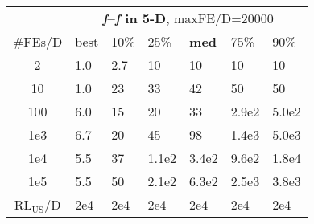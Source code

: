 \begin{tabular}{c|llllll}
 & \multicolumn{6}{|c}{\textbf{\textit{f}\raisebox{-0.35ex}{1}--\textit{f}\raisebox{-0.35ex}{24} in 5-D}, maxFE/D=20000}\\
\#FEs/D & best & 10\% & 25\% & \textbf{med} & 75\% & 90\%\\
2 & \hspace*{1ex}1.0 & \hspace*{1ex}2.7 & 10 & 10 & 10 & 10\\
10 & \hspace*{1ex}1.0 & 23 & 33 & 42 & 50 & 50\\
100 & \hspace*{1ex}6.0 & 15 & 20 & 33 & 2.9e2 & 5.0e2\\
1e3 & \hspace*{1ex}6.7 & 20 & 45 & 98 & 1.4e3 & 5.0e3\\
1e4 & \hspace*{1ex}5.5 & 37 & 1.1e2 & 3.4e2 & 9.6e2 & 1.8e4\\
1e5 & \hspace*{1ex}5.5 & 50 & 2.1e2 & 6.3e2 & 2.5e3 & 3.8e3\\
$\text{RL}_{\text{US}}$/D & 2e4 & 2e4 & 2e4 & 2e4 & 2e4 & 2e4
\end{tabular}

